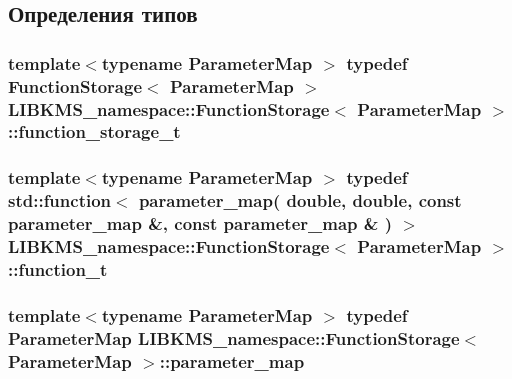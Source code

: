 \subsection{Определения типов}
\hypertarget{classLIBKMS__namespace_1_1FunctionStorage_abf20e17be0153dc6aafcbb501b28ef1e}{
\subsubsection[{function\-\_\-storage\-\_\-t}]{\setlength{\rightskip}{0pt plus 5cm}template$<$typename Parameter\-Map $>$ typedef {\bf Function\-Storage}$<$ Parameter\-Map $>$ {\bf L\-I\-B\-K\-M\-S\-\_\-namespace\-::\-Function\-Storage}$<$ Parameter\-Map $>$\-::{\bf function\-\_\-storage\-\_\-t}}}\label{classLIBKMS__namespace_1_1FunctionStorage_abf20e17be0153dc6aafcbb501b28ef1e}
\hypertarget{classLIBKMS__namespace_1_1FunctionStorage_a0319ecd6e0ca02ee509c5f6b6edeb072}{
\subsubsection[{function\-\_\-t}]{\setlength{\rightskip}{0pt plus 5cm}template$<$typename Parameter\-Map $>$ typedef std\-::function$<$ {\bf parameter\-\_\-map}( double, double, const {\bf parameter\-\_\-map} \&, const {\bf parameter\-\_\-map} \& ) $>$ {\bf L\-I\-B\-K\-M\-S\-\_\-namespace\-::\-Function\-Storage}$<$ Parameter\-Map $>$\-::{\bf function\-\_\-t}}}\label{classLIBKMS__namespace_1_1FunctionStorage_a0319ecd6e0ca02ee509c5f6b6edeb072}
\hypertarget{classLIBKMS__namespace_1_1FunctionStorage_a82b240ff1d5e266642cadfdebd37dfa2}{
\subsubsection[{parameter\-\_\-map}]{\setlength{\rightskip}{0pt plus 5cm}template$<$typename Parameter\-Map $>$ typedef Parameter\-Map {\bf L\-I\-B\-K\-M\-S\-\_\-namespace\-::\-Function\-Storage}$<$ Parameter\-Map $>$\-::{\bf parameter\-\_\-map}}}\label{classLIBKMS__namespace_1_1FunctionStorage_a82b240ff1d5e266642cadfdebd37dfa2}


